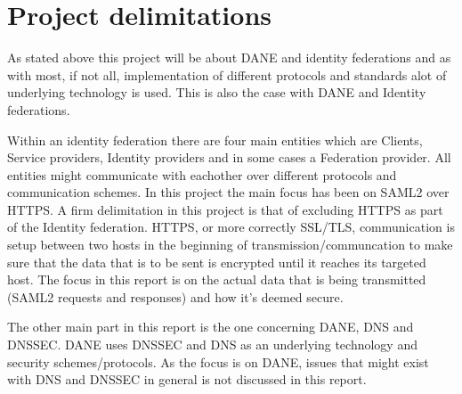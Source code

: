 \section{Project delimitations}
As stated above this project will be about DANE and identity federations and as with most, if not all, implementation of different protocols and standards alot of underlying technology is used.
This is also the case with DANE and Identity federations.

Within an identity federation there are four main entities which are Clients, Service providers, Identity providers and in some cases a Federation provider.
All entities might communicate with eachother over different protocols and communication schemes.
In this project the main focus has been on SAML2 over HTTPS.
A firm delimitation in this project is that of excluding HTTPS as part of the Identity federation.
HTTPS, or more correctly SSL/TLS, communication is setup between two hosts in the beginning of transmission/communcation to make sure that the data that is to be sent is encrypted until it reaches its targeted host.
The focus in this report is on the actual data that is being transmitted (SAML2 requests and responses) and how it's deemed secure. 

The other main part in this report is the one concerning DANE, DNS and DNSSEC.
DANE uses DNSSEC and DNS as an underlying technology and security schemes/protocols\cite{rfc:draft-dane}.
As the focus is on DANE, issues that might exist with DNS and DNSSEC in general is not discussed in this report.





